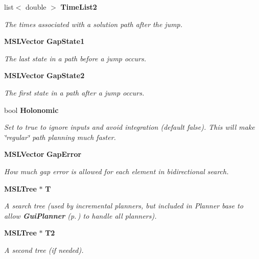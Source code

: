\begin{CompactItemize}
list$<$ double $>$ {\bf Time\-List2}
\begin{CompactList}\small\item\em The times associated with a solution path after the jump.\item\end{CompactList}\item 
{\bf MSLVector} {\bf Gap\-State1}
\begin{CompactList}\small\item\em The last state in a path before a jump occurs.\item\end{CompactList}\item 
{\bf MSLVector} {\bf Gap\-State2}
\begin{CompactList}\small\item\em The first state in a path after a jump occurs.\item\end{CompactList}\item 
bool {\bf Holonomic}
\begin{CompactList}\small\item\em Set to true to ignore inputs and avoid integration (default false). This will make \char`\"{}regular\char`\"{} path planning much faster.\item\end{CompactList}\item 
{\bf MSLVector} {\bf Gap\-Error}
\begin{CompactList}\small\item\em How much gap error is allowed for each element in bidirectional search.\item\end{CompactList}\item 
{\bf MSLTree} $\ast$ {\bf T}
\begin{CompactList}\small\item\em A search tree (used by incremental planners, but included in Planner base to allow {\bf Gui\-Planner} {\rm (p.\,\pageref{classGuiPlanner})} to handle all planners).\item\end{CompactList}\item 
{\bf MSLTree} $\ast$ {\bf T2}
\begin{CompactList}\small\item\em A second tree (if needed).\item\end{CompactList}\item 

\end{CompactItemize}
